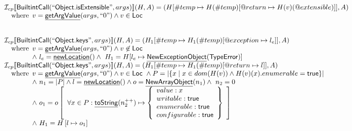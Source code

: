 \documentclass{article}
\makeatletter
\newcommand{\SF}[1]{\mbox{\textsf{#1}}}
\newcommand{\wherec}[1]{{\rm where}\begin{array}[t]{l}#1\end{array}}
\newcommand{\Loc}{\SF{Loc}}
\newcommand{\I}{\mathcal{I}}
\newcommand{\lbr}{\llbracket}
\newcommand{\rbr}{\rrbracket}
\newcommand{\hf}[1]{\underline{\sf #1}}
\newcommand{\varloc}[1]{\##1}
\newcommand{\varprop}[1]{@#1}
\makeatother
\begin{document}
\[\begin{array}{l}
\I _{cp}\lbr \SF{BuiltintCall}(``\SF{Object.isExtensible}",args)\rbr(H,A)
 = (H[\varloc{temp}\mapsto H(\varloc{temp})[\varprop{return}\mapsto H(v)(@extensible)]], A) \\
\quad\wherec{
  v = \hf{getArgValue}(args, ``0") \land v  \in\Loc}\\
\\\\

\I _{cp}\lbr \SF{BuiltintCall}(``\SF{Object.keys}",args)\rbr(H,A)
 = (H_1[\varloc{temp}\mapsto H_1(\varloc{temp})[\varprop{exception}\mapsto l_{e}]], A) \\
\quad\wherec{
  v = \hf{getArgValue}(args, ``0") \land v\not\in\Loc\\
  \land\ l_e = \hf{newLocation}() \land\ H_1=H[l_e\mapsto\hf{NewExceptionObject}(\SF{TypeError})] }\\

\I _{cp}\lbr \SF{BuiltintCall}(``\SF{Object.keys}",args)\rbr(H,A)
 = (H_1[\varloc{temp}\mapsto H_1(\varloc{temp})[\varprop{return}\mapsto l ]], A) \\
\quad\wherec{
  v = \hf{getArgValue}(args, ``0") \land v  \in\Loc\
  \land P = |\{x \mid  x\in dom(H(v)) \land H(v)(x).enumerable = \SF{true} \} |\\
  \land\ n_1 = |P| \land l=\hf{newLocation}() \land o=\hf{NewArrayObject}(n_1) \land\ n_2 = 0\\
  \land\ o_1 = o\left[
    \begin{array}{l}
      \forall x \in P: 
      \hf{toString}(n_2^{++}) \mapsto \left\{
        \begin{array}{l}
          value: x\\
          writable: \SF{true} \\
          enumerable: \SF{true}\\
          configurable: \SF{true} \\
        \end{array}
        \right\}\\
    \end{array}\right]\\
    \land\ H_1 = H\left[l\mapsto o_1\right]
   }\\
\\\\

\end{array}
\]
\end{document}

